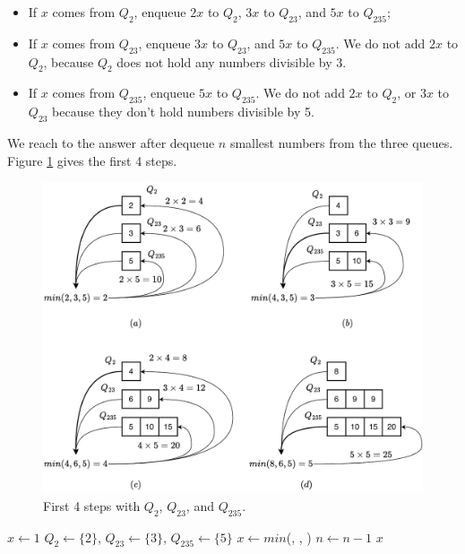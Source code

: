 \documentclass[b5paper]{article}
\begin{document}
\begin{itemize}
\item If $x$ comes from $Q_2$, enqueue $2x$ to $Q_2$, $3x$ to $Q_{23}$, and $5x$ to $Q_{235}$;
\item If $x$ comes from $Q_{23}$, enqueue $3x$ to $Q_{23}$, and $5x$ to $Q_{235}$. We do not add $2x$ to $Q_2$, because $Q_2$ does not hold any numbers divisible by 3.
\item If $x$ comes from $Q_{235}$, enqueue $5x$ to $Q_{235}$. We do not add $2x$ to $Q_2$, or $3x$ to $Q_{23}$ because they don't hold numbers divisible by 5.
\end{itemize}

We reach to the answer after dequeue $n$ smallest numbers from the three queues. Figure \cref{fig:q235} gives the first 4 steps.

\begin{figure}[htbp]
  \centering
  \includegraphics[scale=0.5]{img/q235}
  \caption{First 4 steps with $Q_2$, $Q_{23}$, and $Q_{235}$.}
  \label{fig:q235}
\end{figure}

\begin{algorithmic}[1]
  \State $x \gets 1$
  \State $Q_2 \gets \{ 2 \}$, $Q_{23} \gets \{ 3 \}$, $Q_{235} \gets \{ 5 \}$
    \State $x \gets min$(, , )
      \State {}
      \State {}
      \State {}
      \State {}
      \State {}
      \State {}
      \State {}
    \Else
      \State {}
      \State {}
    \EndIf
    \State $n \gets n - 1$
  \EndWhile
  \State \Return $x$
\EndFunction
\end{algorithmic}
\end{document}
